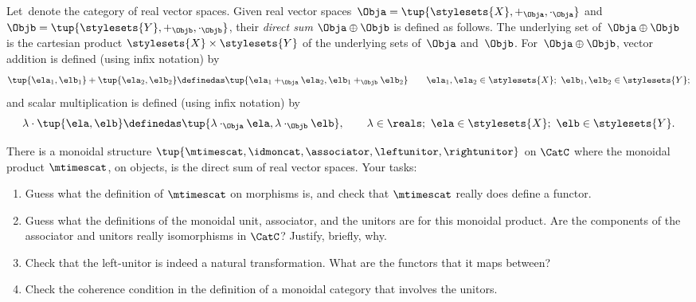 

\begin{gradedexercise}
    \label{ex:MonoidalProductVectDirectSum}

    Let~\CatC denote the category of real vector spaces.
    Given real vector spaces~$\Obja = \tup{\stylesets{X}, {{+_\Obja}}, \cdot_\Obja}$ and~$\Objb = \tup{\stylesets{Y}, +_\Objb, \cdot_\Objb}$, their \emph{direct sum} $\Obja \oplus \Objb$ is defined as follows.
    The underlying set of~$\Obja \oplus \Objb$ is the cartesian product $\stylesets{X} \times \stylesets{Y}$ of the underlying sets of~$\Obja$ and~$\Objb$.
    For~$\Obja \oplus \Objb$, vector addition is defined (using infix notation) by
    \begin{equation}
        \tup{\ela_1, \elb_1} + \tup{\ela_2, \elb_2} \definedas \tup{\ela_1 +_\Obja \ela_2, \elb_1 +_\Objb \elb_2} \quad \quad \ela_1, \ela_2 \in \stylesets{X}; \ \elb_1, \elb_2 \in \stylesets{Y};
    \end{equation}
    and scalar multiplication is defined (using infix notation) by
    \begin{equation}
        \lambda \cdot \tup{\ela, \elb} \definedas \tup{\lambda \cdot_\Obja \ela, \lambda \cdot_\Objb \elb}, \quad \quad \lambda \in \reals; \ \ela \in \stylesets{X}; \ \elb \in \stylesets{Y}.
    \end{equation}

    There is a monoidal structure $\tup{\mtimescat, \idmoncat, \associator, \leftunitor, \rightunitor}$ on $\CatC$ where the monoidal product $\mtimescat$, on objects, is the direct sum of real vector spaces.
    Your tasks:
    \begin{enumerate}
        \item Guess what the definition of $\mtimescat$ on morphisms is, and check that $\mtimescat$ really does define a functor.
        \item Guess what the definitions of the monoidal unit, associator, and the unitors are for this monoidal product.
              Are the components of the associator and unitors really isomorphisms in $\CatC$? Justify, briefly, why.
        \item Check that the left-unitor is indeed a natural transformation.
              What are the functors that it maps between?
        \item Check the coherence condition in the definition of a monoidal category that involves the unitors.
    \end{enumerate}
\end{gradedexercise}

